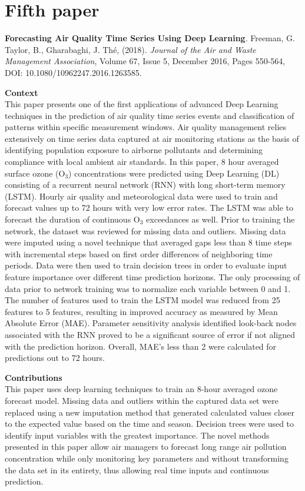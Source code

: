\section{Fifth paper}
\noindent
\textbf{Forecasting Air Quality Time Series Using Deep Learning}. Freeman, G. Taylor, B., Gharabaghi, J.  Th\'e, (2018).  \textit{Journal of the Air and Waste Management Association}, Volume 67, Issue 5, December 2016, Pages 550-564, DOI: 10.1080/10962247.2016.1263585.

\vspace{5mm}
\noindent
\textbf{Context}\\
\noindent
This paper presents one of the first applications of advanced Deep Learning techniques in the prediction of air quality time series events and classification of patterns within specific measurement windows. Air quality management relies extensively on time series data captured at air monitoring stations as the basis of identifying population exposure to airborne pollutants and determining compliance with local ambient air standards. In this paper, 8 hour averaged surface ozone (O$_{3}$) concentrations were predicted using Deep Learning (DL) consisting of a recurrent neural network (RNN) with long short-term memory (LSTM). Hourly air quality and meteorological data were used to train and forecast values up to 72 hours with very low error rates. The LSTM was able to forecast the duration of continuous O$_{3}$ exceedances as well. Prior to training the network, the dataset was reviewed for missing data and outliers. Missing data were imputed using a novel technique that averaged gaps less than 8 time steps with incremental steps based on first order differences of neighboring time periods. Data were then used to train decision trees in order to evaluate input feature importance over different time prediction horizons. The only processing of data prior to network training was to normalize each variable between 0 and 1. The number of features used to train the LSTM model was reduced from 25 features to 5 features, resulting in improved accuracy as measured by Mean Absolute Error (MAE). Parameter sensitivity analysis identified look-back nodes associated with the RNN proved to be a significant source of error if not aligned with the prediction horizon. Overall, MAE's less than 2 were calculated for predictions out to 72 hours. 

\vspace{5mm}
\noindent
\textbf{Contributions}\\
\noindent
This paper uses deep learning techniques to train an 8-hour averaged ozone forecast model. Missing data and outliers within the captured data set were replaced using a new imputation method that generated calculated values closer to the expected value based on the time and season. Decision trees were used to identify input variables with the greatest importance. The novel methods presented in this paper allow air managers to forecast long range air pollution concentration while only monitoring key parameters and without transforming the data set in its entirety, thus allowing real time inputs and continuous prediction.

